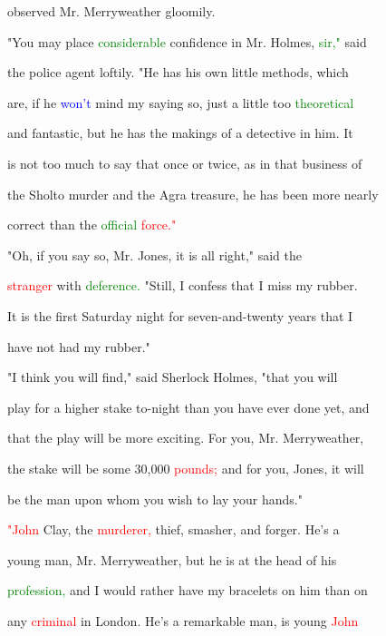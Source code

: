  observed Mr. Merryweather gloomily.



 "You may place \textcolor{green}{considerable} \textcolor{BurntOrange}{confidence} in Mr. Holmes, \textcolor{green}{sir,"} said

 the \textcolor{BurntOrange}{police} agent loftily. "He has his own little methods, which

 are, if he \textcolor{blue}{won't} mind my saying so, just a little too \textcolor{green}{theoretical}

 and fantastic, but he has the makings of a detective in him. It

 is not too much to say that once or twice, as in that business of

 the Sholto \textcolor{BurntOrange}{murder} and the Agra \textcolor{BurntOrange}{treasure,} he has been more nearly

 correct than the \textcolor{green}{official} \textcolor{red}{force."}



 "Oh, if you say so, Mr. Jones, it is all right," said the

 \textcolor{red}{stranger} with \textcolor{green}{deference.} "Still, I \textcolor{BurntOrange}{confess} that I miss my rubber.

 It is the first Saturday night for seven-and-twenty years that I

 have not had my rubber."



 "I think you will find," said Sherlock Holmes, "that you will

 play for a higher stake to-night than you have ever done yet, and

 that the play will be more \textcolor{BurntOrange}{exciting.} For you, Mr. Merryweather,

 the stake will be some 30,000 \textcolor{red}{pounds;} and for you, Jones, it will

 be the man upon whom you wish to lay your hands."



 \textcolor{red}{"John} Clay, the \textcolor{red}{murderer,} \textcolor{BurntOrange}{thief,} smasher, and forger. He's a

 \textcolor{BurntOrange}{young} man, Mr. Merryweather, but he is at the head of his

 \textcolor{green}{profession,} and I would rather have my bracelets on him than on

 any \textcolor{red}{criminal} in London. He's a \textcolor{BurntOrange}{remarkable} man, is \textcolor{BurntOrange}{young} \textcolor{red}{John}

